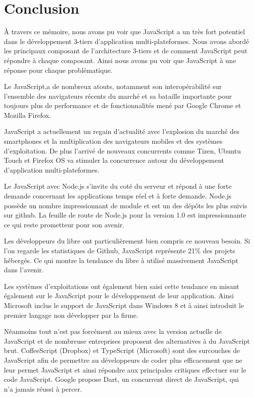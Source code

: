 \chapter{Conclusion}

À travers ce mémoire, nous avons pu voir que JavaScript a un très fort potentiel dans le développement 3-tiers d'application multi-plateformes. Nous avons abordé les principaux composant de l'architecture 3-tiers et de comment JavaScript peut répondre à chaque composant. Ainsi nous avons pu voir que JavaScript à une réponse pour chaque problématique.

Le JavaScript,a de nombreux atouts, notamment son interopérabilité sur l'ensemble des navigateurs récents du marché et sa bataille importante pour toujours plus de performance et de fonctionnalités mené par Google Chrome et Mozilla Firefox.


JavaScript a actuellement un regain d'actualité avec l'explosion du marché des smartphones et la multiplication des navigateurs mobiles et des systèmes d'exploitation. De plus l'arrivé de nouveaux concurrents comme Tizen, Ubuntu Touch et Firefox OS va stimuler la concurrence autour du développement d'application multi-plateformes.

Le JavaScript avec Node.js s'invite du coté du serveur et répond à une forte demande concernant les applications temps réel et à forte demande. Node.js possède un nombre impressionnant de module et est un des dépôts les plus suivis sur github. La feuille de route de Node.js pour la version 1.0 est impressionnante ce qui reste prometteur pour son avenir.

Les développeurs du libre ont particulièrement bien compris ce nouveau besoin. Si l’on regarde les statistiques de Github, JavaScript représente 21\% des projets hébergés. Ce qui montre la tendance du libre à utilisé massivement JavaScript dans l’avenir.

Les systèmes d'exploitations ont également bien saisi cette tendance en misant également sur le JavaScript pour le développement de leur application. Ainsi Microsoft inclus le support de JavaScript dans Windows 8 et à ainsi introduit le premier langage non développer par la firme.

Néanmoins tout n'est pas forcément au mieux avec la version actuelle de JavaScript et de nombreuse entreprises proposent des alternatives à du JavaScript brut. CoffeeScript (Dropbox) et TypeScript (Microsoft) sont des surcouches de JavaScript afin de permettre au développeurs de coder plus efficacement que ne leur permet JavaScript et ainsi répondre aux principales critiques effectuer sur le code JavaScript. Google propose Dart, un concurrent direct de JavaScript, qui n'a jamais réussi à percer. 

